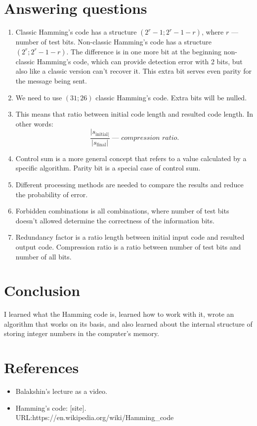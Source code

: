 \documentclass[12pt]{article}
\begin{document}
	\section{\LARGE Answering questions}
	\begin{enumerate}
		\item Classic Hamming's code has a structure  \((2^{r}-1;2^{r}-1-r)\), where \(r\) --- number of test bits. Non-classic Hamming's code has a structure  \((2^{r};2^{r}-1-r)\). The difference is in one more bit at the beginning non-classic Hamming's code, which can provide detection error with 2 bits, but also like a classic version can't recover it. This extra bit serves even parity for the message being sent. 
		\item We need to use \((31;26)\) classic Hamming's code. Extra bits will be nulled. 
		\item This means that ratio between initial code length and resulted code length. In other words:
		\[\frac{|s_{\text{initial}|}}{|s_{\text{final}}|}\;\textit{--- compression ratio.}\] 
		\item Control sum is a more general concept that refers to a value calculated by a specific algorithm. Parity bit is a special case of control sum.
		\item Different processing methods are needed to compare the results and reduce the probability of error.
		\item Forbidden combinations is all combinations, where number of test bits doesn't allowed determine the correctness of the information bits.
		\item Redundancy factor is a ratio length between initial input code and resulted output code.  Compression ratio is a ratio between number of test bits and number of all bits.
	\end{enumerate}
	\newpage
	\section{\LARGE Conclusion}
	I learned what the Hamming code is, learned how to work with it, wrote an algorithm that works on its basis, and also learned about the internal structure of storing integer numbers in the computer's memory.
	\newpage
	\section{\LARGE References}
	\begin{itemize}
		\item Balakshin's lecture as a video.
		\item Hamming's code: [site].\\URL:https://en.wikipedia.org/wiki/Hamming\_code
	\end{itemize}
\end{document}
